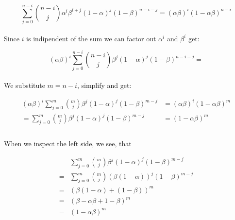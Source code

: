 \begin{equation*}
    \sum_{j=0}^{n-i} \binom{n-i}{j}\alpha^{i}\beta^{i+j}(1-\alpha)^{j}(1-\beta)^{n-i-j} = (\alpha\beta)^{i}(1-\alpha\beta)^{n-i}
\end{equation*}
\\
Since $i$ is indipendent of the sum we can factor out $\alpha^{i}$ and $\beta^{i}$ get:

\begin{equation*}
    (\alpha\beta)^{i}\sum _{j=0}^{n-i} \binom{n-i}{j}\beta^{j}(1-\alpha)^{j}(1-\beta)^{n-i-j} =
\end{equation*}
\\
We substitute $m=n-i$, simplify and get:

\begin{align*}
    (\alpha\beta)^{i}\sum _{j=0}^{m} \binom{m}{j}\beta^{j}(1-\alpha)^{j}(1-\beta)^{m-j} & = (\alpha\beta)^{i}(1-\alpha\beta)^{m} \\
    = \sum_{j=0}^{m} \binom{m}{j}\beta^{j}(1-\alpha)^{j}(1-\beta)^{m-j}                 & = (1-\alpha\beta)^{m}                  \\
\end{align*}
\\
When we inspect the left side, we see, that

\begin{align*}
      & \sum _{j=0}^{m} \binom{m}{j}\beta^{j}(1-\alpha)^{j}(1-\beta)^{m-j} \\
    = & \sum _{j=0}^{m} \binom{m}{j}(\beta(1-\alpha))^{j}(1-\beta)^{m-j}   \\
    = & (\beta(1-\alpha) + (1-\beta))^m                                    \\
    = & (\beta - \alpha\beta + 1 - \beta)^m                                \\
    = & (1 - \alpha\beta)^m
\end{align*}